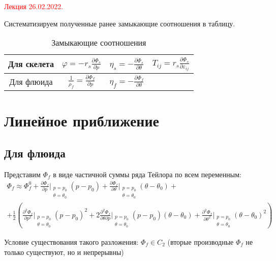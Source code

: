 \documentclass[main.tex]{subfiles}
\begin{document}
\textcolor{red}{Лекция 26.02.2022.}

Систематизируем полученные ранее замыкающие соотношения в таблицу.

\begin{table}[h]
\centering
\caption{Замыкающие соотношения}
\label{table:con}
{\renewcommand{\arraystretch}{3}
\begin{tabular}{ | c | c | c | c | }
\hline
Для скелета& $\displaystyle{}\varphi=-r_s\frac{\partial\Phi_s}{\partial p}$& $\displaystyle{}\eta_s=-\frac{\partial\Phi_s}{\partial\theta}$& $\displaystyle{}T_{ij}=r_s\frac{\partial\Phi_s}{\partial\varepsilon_{ij}}$ \\
\hline
Для флюида& $\displaystyle{}\frac{1}{\rho_f}=\frac{\partial\Phi_f}{\partial p}$& $\displaystyle{}\eta_f=-\frac{\partial\Phi_f}{\partial\theta}$ &  \\
\hline
\end{tabular}}
\end{table}

\section{Линейное приближение}

\subsection{Для флюида}

Представим $\Phi_f$ в виде частичной суммы ряда Тейлора по всем переменным:
\begin{multline}\label{PhiFTaylor}
\Phi_f\approx\Phi_f^0+\frac{\partial\Phi_f}{\partial p}\bigg|_{\substack{p=p_0\\ \theta=\theta_0}}\left(p-p_0\right)+\frac{\partial\Phi_f}{\partial\theta}\bigg|_{\substack{p=p_0\\ \theta=\theta_0}}\left(\theta-\theta_0\right)+\\+\frac{1}{2}\left(\frac{\partial^2\Phi_f}{\partial p^2}\bigg|_{\substack{p=p_0\\ \theta=\theta_0}}\left(p-p_0\right)^2+2\frac{\partial^2\Phi_f}{\partial\theta\partial p}\bigg|_{\substack{p=p_0\\ \theta=\theta_0}}\left(p-p_0\right)\left(\theta-\theta_0\right)+\frac{\partial^2\Phi_f}{\partial\theta^2}\bigg|_{\substack{p=p_0\\ \theta=\theta_0}}\left(\theta-\theta_0\right)^2\right)
\end{multline}

Условие существования такого разложения: $\Phi_f\in C_2$ (вторые производные $\Phi_f$ не только существуют, но и непрерывны)
\end{document}
